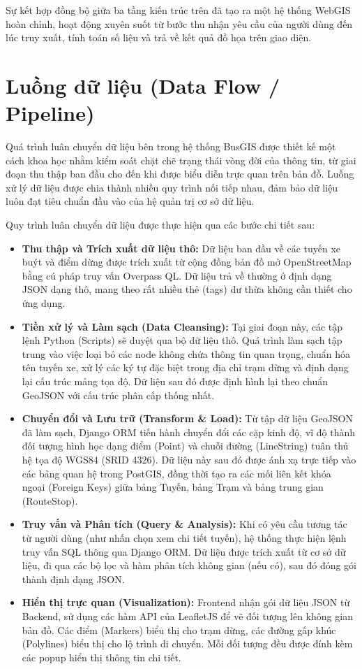 Sự kết hợp đồng bộ giữa ba tầng kiến trúc trên đã tạo ra một hệ thống WebGIS hoàn chỉnh, hoạt động xuyên suốt từ bước thu nhận yêu cầu của người dùng đến lúc truy xuất, tính toán số liệu và trả về kết quả đồ họa trên giao diện.

\section{Luồng dữ liệu (Data Flow / Pipeline)}

Quá trình luân chuyển dữ liệu bên trong hệ thống BusGIS được thiết kế một cách khoa học nhằm kiểm soát chặt chẽ trạng thái vòng đời của thông tin, từ giai đoạn thu thập ban đầu cho đến khi được biểu diễn trực quan trên bản đồ. Luồng xử lý dữ liệu được chia thành nhiều quy trình nối tiếp nhau, đảm bảo dữ liệu luôn đạt tiêu chuẩn đầu vào của hệ quản trị cơ sở dữ liệu.

Quy trình luân chuyển dữ liệu được thực hiện qua các bước chi tiết sau:
\begin{itemize}
    \item \textbf{Thu thập và Trích xuất dữ liệu thô:} Dữ liệu ban đầu về các tuyến xe buýt và điểm dừng được trích xuất từ cộng đồng bản đồ mở OpenStreetMap bằng cú pháp truy vấn Overpass QL. Dữ liệu trả về thường ở định dạng JSON dạng thô, mang theo rất nhiều thẻ (tags) dư thừa không cần thiết cho ứng dụng.
    \item \textbf{Tiền xử lý và Làm sạch (Data Cleansing):} Tại giai đoạn này, các tập lệnh Python (Scripts) sẽ duyệt qua bộ dữ liệu thô. Quá trình làm sạch tập trung vào việc loại bỏ các node không chứa thông tin quan trọng, chuẩn hóa tên tuyến xe, xử lý các ký tự đặc biệt trong địa chỉ trạm dừng và định dạng lại cấu trúc mảng tọa độ. Dữ liệu sau đó được định hình lại theo chuẩn GeoJSON với cấu trúc phân cấp thống nhất.
    \item \textbf{Chuyển đổi và Lưu trữ (Transform \& Load):} Từ tập dữ liệu GeoJSON đã làm sạch, Django ORM tiến hành chuyển đổi các cặp kinh độ, vĩ độ thành đối tượng hình học dạng điểm (Point) và chuỗi đường (LineString) tuân thủ hệ tọa độ WGS84 (SRID 4326). Dữ liệu này sau đó được ánh xạ trực tiếp vào các bảng quan hệ trong PostGIS, đồng thời tạo ra các mối liên kết khóa ngoại (Foreign Keys) giữa bảng Tuyến, bảng Trạm và bảng trung gian (RouteStop).
    \item \textbf{Truy vấn và Phân tích (Query \& Analysis):} Khi có yêu cầu tương tác từ người dùng (như nhấn chọn xem chi tiết tuyến), hệ thống thực hiện lệnh truy vấn SQL thông qua Django ORM. Dữ liệu được trích xuất từ cơ sở dữ liệu, đi qua các bộ lọc và hàm phân tích không gian (nếu có), sau đó đóng gói thành định dạng JSON.
    \item \textbf{Hiển thị trực quan (Visualization):} Frontend nhận gói dữ liệu JSON từ Backend, sử dụng các hàm API của LeafletJS để vẽ đối tượng lên không gian bản đồ. Các điểm (Markers) biểu thị cho trạm dừng, các đường gấp khúc (Polylines) biểu thị cho lộ trình di chuyển. Mỗi đối tượng đều được đính kèm các popup hiển thị thông tin chi tiết.
\end{itemize}

